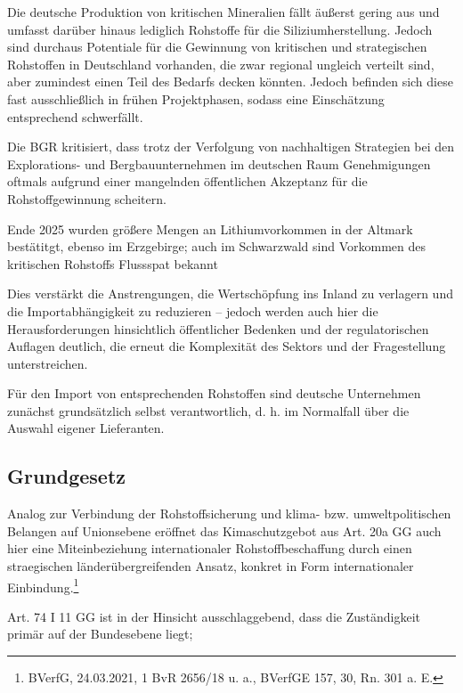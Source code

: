 \documentclass[12pt,a4paper,oneside]{book} %
\begin{document}
Die deutsche Produktion von kritischen Mineralien fällt äußerst gering aus und umfasst darüber hinaus lediglich Rohstoffe für die Siliziumherstellung.\autocite{Commodity TopNews 73, S. 4} Jedoch sind durchaus Potentiale für die Gewinnung von kritischen und strategischen Rohstoffen in Deutschland vorhanden, die zwar regional ungleich verteilt sind, aber zumindest einen Teil des Bedarfs decken könnten. Jedoch befinden sich diese fast ausschließlich in frühen Projektphasen,\autocite{Commodity TopNews 73, S. 10-11} sodass eine Einschätzung entsprechend schwerfällt.

Die BGR kritisiert, dass trotz der Verfolgung von nachhaltigen Strategien bei den Explorations- und Bergbauunternehmen im deutschen Raum Genehmigungen oftmals aufgrund einer mangelnden öffentlichen Akzeptanz für die Rohstoffgewinnung scheitern.\autocite{Commodity TopNews 73, S. 14}

Ende 2025 wurden größere Mengen an Lithiumvorkommen in der Altmark bestätitgt, ebenso im Erzgebirge; auch im Schwarzwald sind Vorkommen des kritischen Rohstoffs Flussspat bekannt

Dies verstärkt die Anstrengungen, die Wertschöpfung ins Inland zu verlagern und die Importabhängigkeit zu reduzieren -- jedoch werden auch hier die Herausforderungen hinsichtlich öffentlicher Bedenken und der regulatorischen Auflagen deutlich, die erneut die Komplexität des Sektors und der Fragestellung unterstreichen.

Für den Import von entsprechenden Rohstoffen sind deutsche Unternehmen zunächst grundsätzlich selbst verantwortlich, d. h. im Normalfall über die Auswahl eigener Lieferanten.\autocite{bibid}

\subsection{Grundgesetz}

Analog zur Verbindung der Rohstoffsicherung und klima- bzw. umweltpolitischen Belangen auf Unionsebene eröffnet das Kimaschutzgebot aus Art. 20a GG auch hier eine Miteinbeziehung internationaler Rohstoffbeschaffung durch einen straegischen länderübergreifenden Ansatz,\autocite{Frenz 2025, S. 1035-1037} konkret in Form \glqq internationaler Einbindung\grqq.\footnote{BVerfG, 24.03.2021, 1 BvR 2656/18 u. a., BVerfGE 157, 30, Rn. 301 a. E.}


Art. 74 I 11 GG ist in der Hinsicht ausschlaggebend, dass die Zuständigkeit primär auf der Bundesebene liegt;
\end{document}
